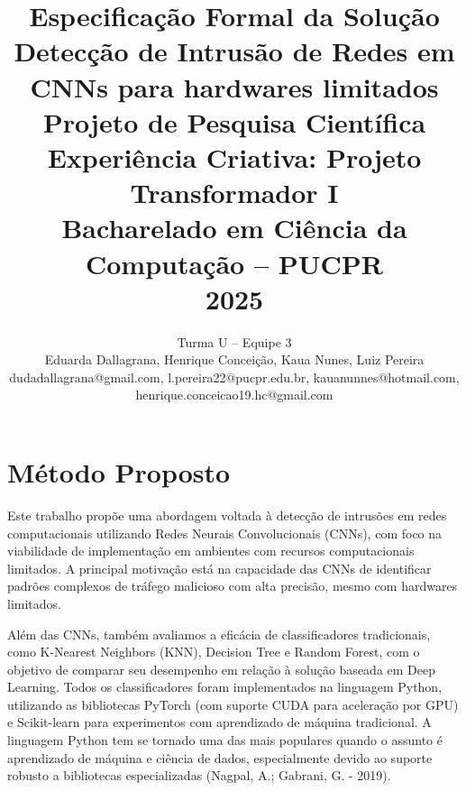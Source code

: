 \documentclass[conference]{IEEEtran}
\begin{document}

\title{Especificação Formal da Solução\\
\vspace{0.4cm}
Detecção de Intrusão de Redes em CNNs para hardwares limitados\\
\vspace{0.4cm}
{\Large Projeto de Pesquisa Científica\\
Experiência Criativa: Projeto Transformador I\\
Bacharelado em Ciência da Computação -- PUCPR\\
2025}}

\author{
    Turma {U} -- Equipe {3} \\
    Eduarda Dallagrana, Henrique Conceição, Kaua Nunes, Luiz Pereira\\
    {\centering\small dudadallagrana@gmail.com, l.pereira22@pucpr.edu.br, kauanunnes@hotmail.com, henrique.conceicao19.hc@gmail.com}
}


\maketitle

\section{Método Proposto}

    Este trabalho propõe uma abordagem voltada à detecção de intrusões em redes computacionais utilizando Redes Neurais Convolucionais (CNNs), com foco na viabilidade de implementação em ambientes com recursos computacionais limitados. A principal motivação está na capacidade das CNNs de identificar padrões complexos de tráfego malicioso com alta precisão, mesmo com hardwares limitados.
    
    Além das CNNs, também avaliamos a eficácia de classificadores tradicionais, como K-Nearest Neighbors (KNN), Decision Tree e Random Forest, com o objetivo de comparar seu desempenho em relação à solução baseada em Deep Learning. Todos os classificadores foram implementados na linguagem Python, utilizando as bibliotecas PyTorch (com suporte CUDA para aceleração por GPU) e Scikit-learn para experimentos com aprendizado de máquina tradicional. A linguagem Python tem se tornado uma das mais populares quando o assunto é aprendizado de máquina e ciência de dados, especialmente devido ao suporte robusto a bibliotecas especializadas (Nagpal, A.; Gabrani, G. - 2019).
    
\end{document}

